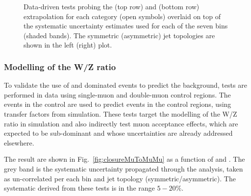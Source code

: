 \begin{figure}[h!]
\begin{center}
    \caption{Data-driven tests probing the \alphat (top row) and \bdphi (bottom row) extrapolation for each
      \njet category (open symbols) overlaid on top of the systematic
      uncertainty estimates used for each of the seven \scalht bins (shaded bands). 
      The symmetric (asymmetric) jet topologies are shown in the left (right) plot. 
    }
    \label{fig:closureAlphaT}
  \end{center} 
\end{figure}



\subsubsection*{Modelling of the W/Z ratio}
\label{sec:tfSyst_WZratio}
To validate the use of \wmj and \ttbar dominated \mj events to predict the \znunu
background, tests are performed in data using single-muon and double-muon control regions. 
The events in the \mj control are used to predict events in the \mmj control regions, 
using transfer factors from simulation. 
These tests target the modelling of the W/Z ratio in simulation and 
also indirectly test muon acceptance effects, which 
are expected to be sub-dominant and whose uncertainties are already addressed elsewhere.

The result are shown in Fig.~\ref{fig:closureMuToMuMu} as a function of \scalht and \njet. 
The grey band is the systematic uncertainty propagated through the analysis, 
taken as un-correlated per each \scalht bin and jet topology (symmetric/asymmetric). The systematic derived from these tests is
in the range $5-20\%$.



